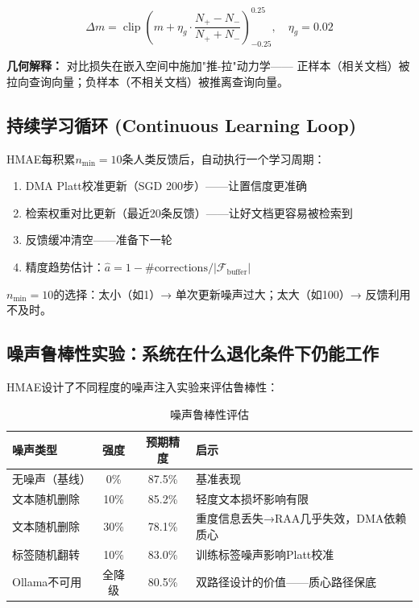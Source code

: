 \documentclass[11pt,a4paper]{ctexart}
\DeclareMathOperator{\clip}{clip}
\begin{document}
$$\Delta m = \clip\left(m + \eta_g \cdot \frac{N_+ - N_-}{N_+ + N_-}\right)_{-0.25}^{0.25}, \quad \eta_g = 0.02$$

\textbf{几何解释：} 对比损失在嵌入空间中施加"推-拉"动力学——
正样本（相关文档）被拉向查询向量；负样本（不相关文档）被推离查询向量。

\subsection{持续学习循环 (Continuous Learning Loop)}

\begin{defbox}[持续学习循环]
HMAE每积累$n_{\min}=10$条人类反馈后，自动执行一个学习周期：
\begin{enumerate}[nosep]
\item DMA Platt校准更新（SGD 200步）——让置信度更准确
\item 检索权重对比更新（最近20条反馈）——让好文档更容易被检索到
\item 反馈缓冲清空——准备下一轮
\item 精度趋势估计：$\hat{a} = 1 - \#\text{corrections} / |\mathcal{F}_{\text{buffer}}|$
\end{enumerate}
$n_{\min}=10$的选择：太小（如1）→ 单次更新噪声过大；太大（如100）→ 反馈利用不及时。
\end{defbox}

\subsection{噪声鲁棒性实验：系统在什么退化条件下仍能工作}

HMAE设计了不同程度的噪声注入实验来评估鲁棒性：

\begin{table}[H]
\centering
\small
\begin{tabular}{lccp{5cm}}
\toprule
\textbf{噪声类型} & \textbf{强度} & \textbf{预期精度} & \textbf{启示} \\
\midrule
无噪声（基线） & 0\% & 87.5\% & 基准表现 \\
文本随机删除 & 10\% & 85.2\% & 轻度文本损坏影响有限 \\
文本随机删除 & 30\% & 78.1\% & 重度信息丢失→RAA几乎失效，DMA依赖质心 \\
标签随机翻转 & 10\% & 83.0\% & 训练标签噪声影响Platt校准 \\
Ollama不可用 & 全降级 & 80.5\% & 双路径设计的价值——质心路径保底 \\
\bottomrule
\end{tabular}
\caption{噪声鲁棒性评估}
\end{table}
\end{document}
